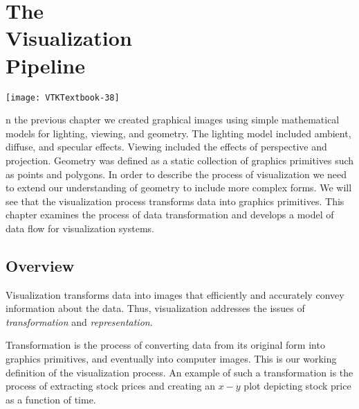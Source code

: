 \chapter[The Visualization Pipeline]{The\\ Visualization\\ Pipeline}
\label{chap:visualization_pipeline}

\vspace{-11\baselineskip} %
\hfill
 \begin{minipage}{0.5\textwidth}
 \centering
 \texttt{[image: VTKTextbook-38]}
 \end{minipage}
\vspace{2\baselineskip}

n the previous chapter we created graphical images using simple mathematical models for lighting, viewing, and geometry. The lighting model included ambient, diffuse, and specular effects. Viewing included the effects of perspective and projection. Geometry was defined as a static collection of graphics primitives such as points and polygons. In order to describe the process of visualization we need to extend our understanding of geometry to include more complex forms. We will see that the visualization process transforms data into graphics primitives. This chapter examines the process of data transformation and develops a model of data flow for visualization systems.

\section {Overview}
Visualization transforms data into images that efficiently and accurately convey information about the data. Thus, visualization addresses the issues of \emph{transformation} and \emph{representation}.

Transformation is the process of converting data from its original form into graphics primitives, and eventually into computer images. This is our working definition of the visualization process. An example of such a transformation is the process of extracting stock prices and creating an $x-y$ plot depicting stock price as a function of time.


